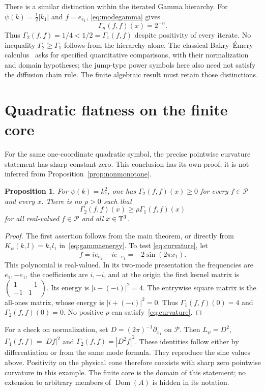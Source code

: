\documentclass[11pt]{article}
\newtheorem{proposition}[theorem]{Proposition}
\theoremstyle{remark}\newtheorem{remark}[theorem]{Remark}
\DeclareMathOperator{\Dom}{Dom}
\begin{document}
There is a similar distinction within the iterated Gamma
hierarchy. For $\psi(k)=\tfrac12|k_1|$ and $f=e_{e_1}$,
\eqref{eq:modegamma} gives
\[
 \Gamma_n(f,f)(x)=2^{-n}.
\]
Thus $\Gamma_2(f,f)=1/4<1/2=\Gamma_1(f,f)$ despite positivity
of every iterate. No inequality $\Gamma_2\geq\Gamma_1$ follows
from the hierarchy alone. The classical Bakry--\'Emery
calculus~\cite{bakryemery} asks for specified quantitative
comparisons, with their normalization and domain hypotheses;
the jump-type power symbols here also need not satisfy the
diffusion chain rule. The finite algebraic result must retain
those distinctions.

\section{Quadratic flatness on the finite core}
For the same one-coordinate quadratic symbol, the precise
pointwise curvature statement has sharp constant zero. This
conclusion has its own proof; it is not inferred from
Proposition~\ref{prop:nonmonotone}.

\begin{proposition}\label{prop:flat}
For $\psi(k)=k_1^2$, one has $\Gamma_2(f,f)(x)\geq0$ for every
$f\in\mathcal P$ and every $x$. There is no $\rho>0$ such that
\begin{equation}\label{eq:curvature}
 \Gamma_2(f,f)(x)\geq\rho\Gamma_1(f,f)(x)
\end{equation}
for all real-valued $f\in\mathcal P$ and all $x\in\mathbb T^3$.
\end{proposition}
\begin{proof}
The first assertion follows from the main theorem, or directly
from $K_\psi(k,l)=k_1l_1$ in~\eqref{eq:gammaenergy}. To test
\eqref{eq:curvature}, let
\[
 f=ie_{e_1}-ie_{-e_1}=-2\sin(2\pi x_1).
\]
This polynomial is real-valued. In its two-mode presentation
the frequencies are $e_1,-e_1$, the coefficients are $i,-i$,
and at the origin the first kernel matrix is
$\left(\begin{smallmatrix}1&-1\\-1&1\end{smallmatrix}\right)$.
Its energy is $|i-(-i)|^2=4$. The entrywise square matrix is
the all-ones matrix, whose energy is $|i+(-i)|^2=0$.
Thus $\Gamma_1(f,f)(0)=4$ and $\Gamma_2(f,f)(0)=0$.
No positive $\rho$ can satisfy~\eqref{eq:curvature}.
\end{proof}

For a check on normalization, set $D=(2\pi)^{-1}\partial_{x_1}$
on $\mathcal P$. Then $L_\psi=D^2$,
$\Gamma_1(f,f)=|Df|^2$ and $\Gamma_2(f,f)=|D^2f|^2$.
These identities follow either by differentiation or from the
same mode formula. They reproduce the sine values above.
Positivity on the physical cone therefore coexists with sharp
zero pointwise curvature in this example. The finite core is
the domain of this statement; no extension to arbitrary
members of $\Dom(A)$ is hidden in its notation.
\end{document}
